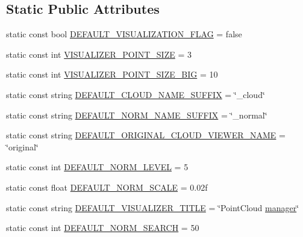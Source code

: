 \subsection*{Static Public Attributes}
\begin{DoxyCompactItemize}
\item 
static const bool \hyperlink{classpcm_1_1PCManager_aaddf643dfa30897c1851d97cc6732e73}{D\-E\-F\-A\-U\-L\-T\-\_\-\-V\-I\-S\-U\-A\-L\-I\-Z\-A\-T\-I\-O\-N\-\_\-\-F\-L\-A\-G} = false
\item 
static const int \hyperlink{classpcm_1_1PCManager_abb62ef760d6d8436c18cac80bb111898}{V\-I\-S\-U\-A\-L\-I\-Z\-E\-R\-\_\-\-P\-O\-I\-N\-T\-\_\-\-S\-I\-Z\-E} = 3
\item 
static const int \hyperlink{classpcm_1_1PCManager_a53820f1bdb5fc94830c0a04334916d12}{V\-I\-S\-U\-A\-L\-I\-Z\-E\-R\-\_\-\-P\-O\-I\-N\-T\-\_\-\-S\-I\-Z\-E\-\_\-\-B\-I\-G} = 10
\item 
static const string \hyperlink{classpcm_1_1PCManager_aceb117314161d997ffcd102c4a2e3668}{D\-E\-F\-A\-U\-L\-T\-\_\-\-C\-L\-O\-U\-D\-\_\-\-N\-A\-M\-E\-\_\-\-S\-U\-F\-F\-I\-X} = \char`\"{}\-\_\-cloud\char`\"{}
\item 
static const string \hyperlink{classpcm_1_1PCManager_a7cacb2df053d19d4d6d346a0b45082d9}{D\-E\-F\-A\-U\-L\-T\-\_\-\-N\-O\-R\-M\-\_\-\-N\-A\-M\-E\-\_\-\-S\-U\-F\-F\-I\-X} = \char`\"{}\-\_\-normal\char`\"{}
\item 
static const string \hyperlink{classpcm_1_1PCManager_adec1cf4832f6f63548aa3a4001077ec5}{D\-E\-F\-A\-U\-L\-T\-\_\-\-O\-R\-I\-G\-I\-N\-A\-L\-\_\-\-C\-L\-O\-U\-D\-\_\-\-V\-I\-E\-W\-E\-R\-\_\-\-N\-A\-M\-E} = \char`\"{}original\char`\"{}
\item 
static const int \hyperlink{classpcm_1_1PCManager_af4959e1ce5dc2650aab2754472a18ac8}{D\-E\-F\-A\-U\-L\-T\-\_\-\-N\-O\-R\-M\-\_\-\-L\-E\-V\-E\-L} = 5
\item 
static const float \hyperlink{classpcm_1_1PCManager_a95ec8d073d4a573b550a44031f986608}{D\-E\-F\-A\-U\-L\-T\-\_\-\-N\-O\-R\-M\-\_\-\-S\-C\-A\-L\-E} = 0.\-02f
\item 
static const string \hyperlink{classpcm_1_1PCManager_a87b7714f198b56306c4fc8f10b71ba27}{D\-E\-F\-A\-U\-L\-T\-\_\-\-V\-I\-S\-U\-A\-L\-I\-Z\-E\-R\-\_\-\-T\-I\-T\-L\-E} = \char`\"{}Point\-Cloud \hyperlink{obj__segmentation_8cpp_a21221f555fa05f2c3f45ff5592a25197}{manager}\char`\"{}
\item 
static const int \hyperlink{classpcm_1_1PCManager_a507973d100aef370fd7a2feeda4fb273}{D\-E\-F\-A\-U\-L\-T\-\_\-\-N\-O\-R\-M\-\_\-\-S\-E\-A\-R\-C\-H} = 50

\end{DoxyCompactItemize}
